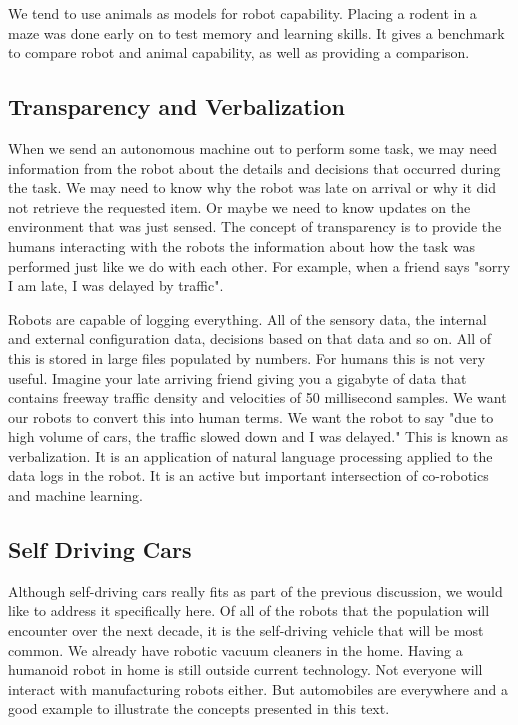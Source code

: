 We tend to use animals as models for robot capability. Placing a rodent
in a maze was done early on to test memory and learning skills. It gives
a benchmark to compare robot and animal capability, as well as providing
a comparison.

\hypertarget{transparency-and-verbalization}{%
\subsection{Transparency and
Verbalization}\label{transparency-and-verbalization}}

When we send an autonomous machine out to perform some task, we may need
information from the robot about the details and decisions that occurred
during the task. We may need to know why the robot was late on arrival
or why it did not retrieve the requested item. Or maybe we need to know
updates on the environment that was just sensed. The concept of
transparency is to provide the humans interacting with the robots the
information about how the task was performed just like we do with each
other. For example, when a friend says "sorry I am late, I was delayed
by traffic".

Robots are capable of logging everything. All of the sensory data, the
internal and external configuration data, decisions based on that data
and so on. All of this is stored in large files populated by numbers.
For humans this is not very useful. Imagine your late arriving friend
giving you a gigabyte of data that contains freeway traffic density and
velocities of 50 millisecond samples. We want our robots to convert this
into human terms. We want the robot to say "due to high volume of cars,
the traffic slowed down and I was delayed." This is known as
verbalization. It is an application of natural language processing
applied to the data logs in the robot. It is an active but important
intersection of co-robotics and machine learning.

\hypertarget{self-driving-cars}{%
\subsection{Self Driving Cars}\label{self-driving-cars}}

Although self-driving cars really fits as part of the previous
discussion, we would like to address it specifically here. Of all of the
robots that the population will encounter over the next decade, it is
the self-driving vehicle that will be most common. We already have
robotic vacuum cleaners in the home. Having a humanoid robot in home is
still outside current technology. Not everyone will interact with
manufacturing robots either. But automobiles are everywhere and a good
example to illustrate the concepts presented in this text.

